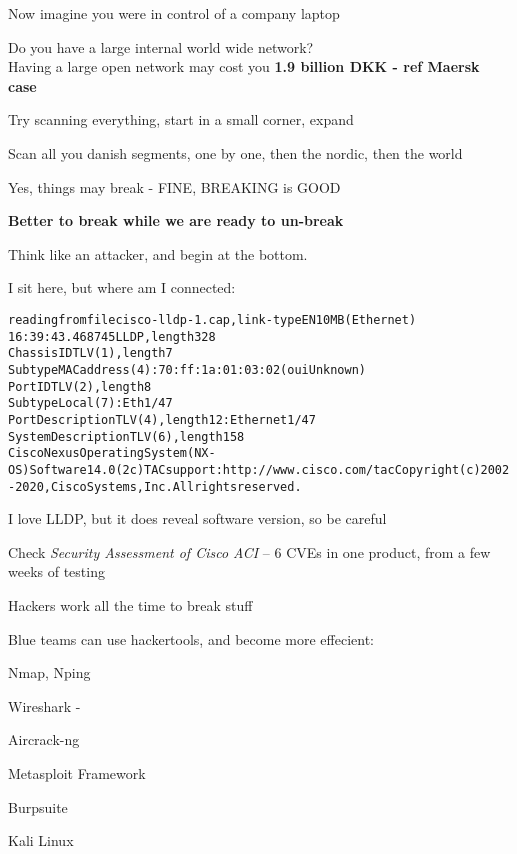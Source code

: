 \documentclass[Screen16to9,17pt]{foils}
\begin{document}
\begin{list2}
\item Now imagine you were in control of a company laptop
\item Do you have a large internal world wide network?\\
Having a large open network may cost you {\bf 1.9 billion DKK - ref Maersk case}
\item Try scanning everything, start in a small corner, expand
\item Scan all you danish segments, one by one, then the nordic, then the world
\item Yes, things may break - FINE, BREAKING is GOOD
\end{list2}

\centerline{\bf Better to break while we are ready to un-break}


Think like an attacker, and begin at the bottom.

I sit here, but where am I connected:
\begin{alltt}\footnotesize
reading from file cisco-lldp-1.cap, link-type EN10MB (Ethernet)
16:39:43.468745 LLDP, length 328
        Chassis ID TLV (1), length 7
          Subtype MAC address (4): 70:ff:1a:01:03:02 (oui Unknown)
        Port ID TLV (2), length 8
          Subtype Local (7): Eth1/47
        Port Description TLV (4), length 12: Ethernet1/47
        System Description TLV (6), length 158
          Cisco Nexus Operating System (NX-OS) Software 14.0(2c) TAC support: http://www.cisco.com/tac Copyright (c) 2002-2020, Cisco Systems, Inc. All rights reserved.
\end{alltt}

\vskip 5mm
\centerline{I love LLDP, but it does reveal software version, so be careful}
Check \emph{Security Assessment of Cisco ACI} -- 6 CVEs in one product, from a few weeks of testing\\


Hackers work all the time to break stuff

Blue teams can use hackertools, and become more effecient:
\begin{list2}
\item Nmap, Nping 
\item Wireshark - 
\item Aircrack-ng 
\item Metasploit Framework 
\item Burpsuite 
\item Kali Linux 
\end{list2}
\end{document}

